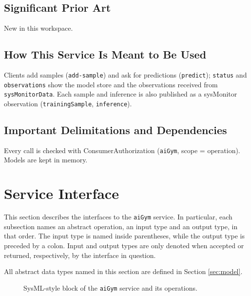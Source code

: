 \documentclass[a4paper]{arrowhead}
\begin{document}
\subsection{Significant Prior Art}

New in this workspace.

\subsection{How This Service Is Meant to Be Used}

Clients add samples (\texttt{add-\allowbreak{}sample}) and ask for predictions (\texttt{predict}); \texttt{status} and \texttt{observations} show the model store and the observations received from \texttt{sysMonitorData}. Each sample and inference is also published as a sysMonitor observation (\texttt{trainingSample}, \texttt{inference}).

\subsection{Important Delimitations and Dependencies}
\label{sec:delimitations}

Every call is checked with Consumer\allowbreak{}Authorization (\texttt{aiGym}, scope = operation). Models are kept in memory.

\newpage

\section{Service Interface}
\label{sec:operations}

This section describes the interfaces to the \texttt{aiGym} service.
In particular, each subsection names an abstract operation, an input type and an output type, in that order.
The input type is named inside parentheses, while the output type is preceded by a colon.
Input and output types are only denoted when accepted or returned, respectively, by the interface in question.

All abstract data types named in this section are defined in Section \ref{sec:model}.

\begin{figure}[ht!]
  \centering
  \caption{SysML-style block of the \texttt{aiGym} service and its operations.}
  \label{fig:SD}
\end{figure}
\end{document}
